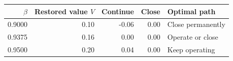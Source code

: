 \begin{tabular}{@{}rrrrl@{}}\toprule
$\beta$ & Restored value $V$ & Continue & Close & Optimal path \\\midrule
0.9000 & 0.10 & -0.06 & 0.00 & Close permanently \\
0.9375 & 0.16 & 0.00 & 0.00 & Operate or close \\
0.9500 & 0.20 & 0.04 & 0.00 & Keep operating \\
\bottomrule\end{tabular}
